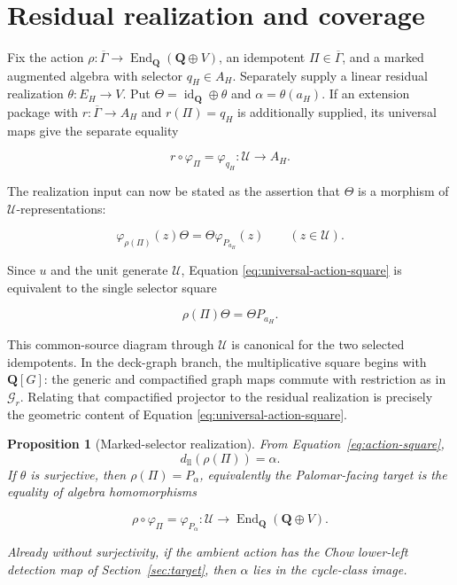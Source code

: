 \documentclass[11pt]{article}
\newtheorem{proposition}[theorem]{Proposition}
\theoremstyle{definition}
\theoremstyle{remark}
\DeclareMathOperator{\End}{End}
\newcommand{\Q}{\mathbf Q}
\newcommand{\Gbar}{\overline{\Gamma}}
\begin{document}
\section{Residual realization and coverage}
\label{sec:coverage}

Fix the action \(\rho:\Gbar\to\End_{\Q}(\Q\oplus V)\), an idempotent
\(\Pi\in\Gbar\), and a marked augmented algebra with selector
\(q_H\in A_H\).  Separately supply a linear residual realization
\(\theta:E_H\to V\).  Put
\(\Theta=\operatorname{id}_{\Q}\oplus\theta\) and
\(\alpha=\theta(a_H)\).  If an extension package with
\(r:\Gbar\to A_H\) and \(r(\Pi)=q_H\) is additionally supplied, its
universal maps give the separate equality

\begin{equation}
\label{eq:restriction-u-square}
  r\circ\varphi_\Pi=\varphi_{q_H}:\mathcal U\longrightarrow A_H.
\end{equation}

The realization input can now be stated as the assertion that \(\Theta\) is
a morphism of \(\mathcal U\)-representations:

\begin{equation}
\label{eq:universal-action-square}
  \varphi_{\rho(\Pi)}(z)\Theta
    =\Theta\varphi_{P_{a_H}}(z)
  \qquad(z\in\mathcal U).
\end{equation}

Since \(u\) and the unit generate \(\mathcal U\), Equation
\eqref{eq:universal-action-square} is equivalent to the single selector
square

\begin{equation}
\label{eq:action-square}
  \rho(\Pi)\Theta=\Theta P_{a_H}.
\end{equation}

This common-source diagram through \(\mathcal U\) is canonical for the
two selected idempotents. In the deck-graph branch, the multiplicative
square begins with \(\Q[G]\): the generic and
compactified graph maps commute with restriction as in
\(\mathscr G_r\).  Relating that compactified projector to the residual
realization is precisely the geometric content of Equation
\eqref{eq:universal-action-square}.

\begin{proposition}[Marked-selector realization]
\label{prop:realization}
From Equation~\eqref{eq:action-square},
\[
  d_{\mathrm{ll}}(\rho(\Pi))=\alpha.
\]
If \(\theta\) is surjective, then \(\rho(\Pi)=P_\alpha\), equivalently the
Palomar-facing target is the equality of algebra homomorphisms

\begin{equation}
\label{eq:palomar-target-square}
  \rho\circ\varphi_\Pi
    =\varphi_{P_\alpha}:
      \mathcal U\longrightarrow
      \End_{\Q}(\Q\oplus V).
\end{equation}

Already without surjectivity, if the ambient action has the Chow lower-left detection map of
Section~\ref{sec:target}, then \(\alpha\) lies in the cycle-class image.
\end{proposition}
\end{document}
